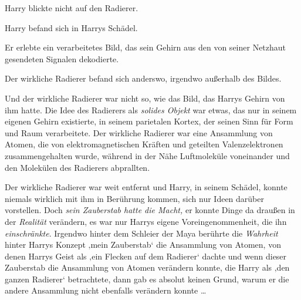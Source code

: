 Harry blickte nicht auf den Radierer.

Harry befand sich in Harrys Schädel.

Er erlebte ein verarbeitetes Bild, das sein Gehirn aus den von seiner Netzhaut gesendeten Signalen dekodierte.

Der wirkliche Radierer befand sich anderswo, irgendwo außerhalb des Bildes.

Und der wirkliche Radierer war nicht so, wie das Bild, das Harrys Gehirn von ihm hatte. Die Idee des Radierers als \emph{solides Objekt} war etwas, das nur in seinem eigenen Gehirn existierte, in seinem parietalen Kortex, der seinen Sinn für Form und Raum verarbeitete. Der wirkliche Radierer war eine Ansammlung von Atomen, die von elektromagnetischen Kräften und geteilten Valenzelektronen zusammengehalten wurde, während in der Nähe Luftmoleküle voneinander und den Molekülen des Radierers abprallten.

Der wirkliche Radierer war weit entfernt und Harry, in seinem Schädel, konnte niemals wirklich mit ihm in Berührung kommen, sich nur Ideen darüber vorstellen. Doch \emph{sein Zauberstab hatte die Macht,} er konnte Dinge da draußen in der \emph{Realität} verändern, es war nur Harrys eigene Voreingenommenheit, die ihn \emph{einschränkte}. Irgendwo hinter dem Schleier der Maya berührte die \emph{Wahrheit} hinter Harrys Konzept ‚mein Zauberstab‘ die Ansammlung von Atomen, von denen Harrys Geist als ‚ein Flecken auf dem Radierer‘ dachte und wenn dieser Zauberstab die Ansammlung von Atomen verändern konnte, die Harry als ‚den ganzen Radierer‘ betrachtete, dann gab es absolut keinen Grund, warum er die andere Ansammlung nicht ebenfalls verändern konnte …

